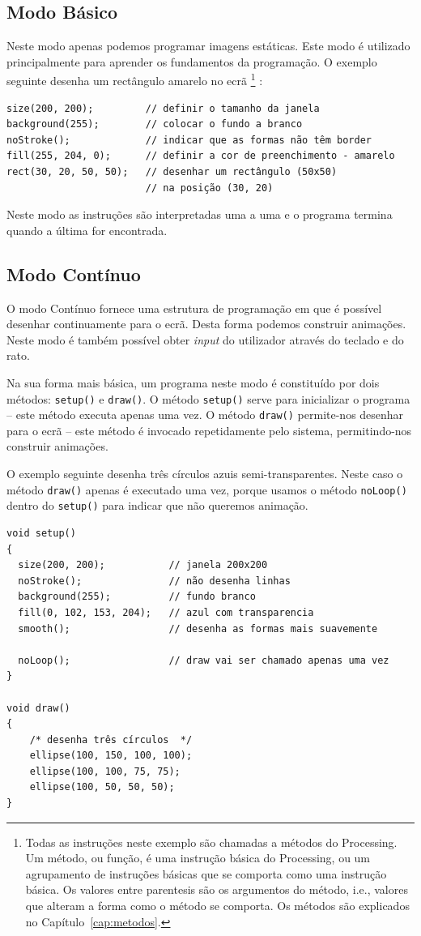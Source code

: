 \subsection{Modo Básico}
Neste modo apenas podemos programar imagens estáticas. Este modo é utilizado principalmente para aprender os fundamentos da programação. 
O exemplo seguinte desenha um rectângulo amarelo no ecrã%
\footnote{Todas as instruções neste exemplo são chamadas a métodos do Processing. Um método, ou função, é uma instrução básica do Processing, ou um agrupamento
de instruções básicas que se comporta como uma instrução básica. Os valores entre parentesis são os argumentos do método, i.e., valores que alteram a forma como o método se comporta. Os métodos são explicados no Capítulo~\ref{cap:metodos}.}
:
\begin{lstlisting}
size(200, 200);         // definir o tamanho da janela
background(255);        // colocar o fundo a branco
noStroke();             // indicar que as formas não têm border
fill(255, 204, 0);      // definir a cor de preenchimento - amarelo
rect(30, 20, 50, 50);   // desenhar um rectângulo (50x50) 
                        // na posição (30, 20)
\end{lstlisting}
Neste modo as instruções são interpretadas uma a uma e o programa termina quando a última for encontrada.

\subsection{Modo Contínuo}
O modo Contínuo fornece uma estrutura de programação em que é possível desenhar continuamente para o ecrã. Desta forma podemos construir animações. Neste modo é também possível obter \emph{input} do utilizador através do teclado e do rato.

Na sua forma mais básica, um programa neste modo é constituído por dois métodos: \texttt{setup()} e \texttt{draw()}. O método \texttt{setup()} serve para inicializar o programa -- este método executa apenas uma vez. O método \texttt{draw()} permite-nos desenhar para o ecrã -- este método é invocado repetidamente pelo sistema, permitindo-nos construir animações.


O exemplo seguinte desenha três círculos azuis semi-transparentes. Neste caso o método \texttt{draw()} apenas é executado uma vez, porque usamos o método \texttt{noLoop()} dentro do \texttt{setup()} para indicar que não queremos animação.
\begin{lstlisting}
void setup()
{
  size(200, 200);           // janela 200x200
  noStroke();               // não desenha linhas
  background(255);          // fundo branco
  fill(0, 102, 153, 204);   // azul com transparencia
  smooth();                 // desenha as formas mais suavemente

  noLoop();                 // draw vai ser chamado apenas uma vez
}

void draw()
{
    /* desenha três círculos  */
    ellipse(100, 150, 100, 100); 
    ellipse(100, 100, 75, 75);
    ellipse(100, 50, 50, 50);
}
\end{lstlisting}

